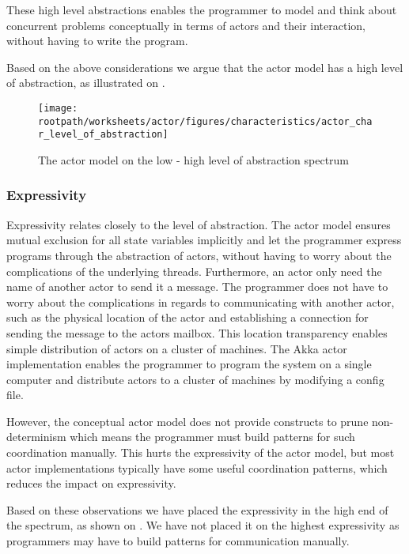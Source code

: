 These high level abstractions enables the programmer to model and think about concurrent problems conceptually in terms of actors and their interaction, without having to write the program.

Based on the above considerations we argue that the actor model has a high level of abstraction, as illustrated on .

\begin{figure}[htbp]
\centering
 \texttt{[image: \\rootpath/worksheets/actor/figures/characteristics/actor\_char\_level\_of\_abstraction]} 
 \caption{The actor model on the low - high level of abstraction spectrum}
\label{fig:actor_level_of_abstraction}
\end{figure}

\subsubsection{Expressivity}\label{sec:actor_expressivity}
Expressivity relates closely to the level of abstraction. The actor model ensures mutual exclusion for all state variables implicitly and let the programmer express programs through the abstraction of actors, without having to worry about the complications of the underlying threads. Furthermore, an actor only need the name of another actor to send it a message. The programmer does not have to worry about the complications in regards to communicating with another actor, such as the physical location of the actor and establishing a connection for sending the message to the actors mailbox. This location transparency enables simple distribution of actors on a cluster of machines. The Akka actor implementation enables the programmer to program the system on a single computer and distribute actors to a cluster of machines by modifying a config file.

However, the conceptual actor model does not provide constructs to prune non-determinism which means the programmer must build patterns for such coordination manually. This hurts the expressivity of the actor model, but most actor implementations typically have some useful coordination patterns, which reduces the impact on expressivity.

Based on these observations we have placed the expressivity in the high end of the spectrum, as shown on . We have not placed it on the highest expressivity as programmers may have to build patterns for communication manually.

